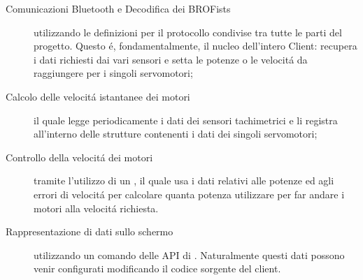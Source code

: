 \begin{description}
    \item[Comunicazioni Bluetooth e Decodifica dei BROFists]utilizzando
        le definizioni per il protocollo condivise tra tutte le parti del
        progetto. Questo \'e, fondamentalmente, il nucleo dell'intero
        Client: recupera i dati richiesti dai vari sensori e setta le
        potenze o le velocit\'a da raggiungere per i singoli servomotori;
    \item[Calcolo delle velocit\'a istantanee dei motori]il quale legge
        periodicamente i dati dei sensori tachimetrici e li registra
        all'interno delle strutture contenenti i dati dei singoli
        servomotori;
    \item[Controllo della velocit\'a dei motori]tramite l'utilizzo di un
        \PID, il quale usa i dati relativi alle
        potenze ed agli errori di velocit\'a per calcolare quanta potenza
        utilizzare per far andare i motori alla velocit\'a richiesta.
    \item[Rappresentazione di dati sullo schermo]utilizzando un comando
        delle API di \nxtOSEK{}. Naturalmente questi dati possono venir
        configurati modificando il codice sorgente del client.
\end{description}

\cleardoublepage

